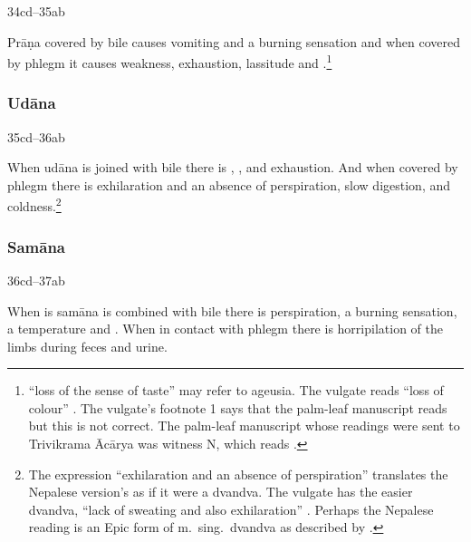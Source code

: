 \begin{translation}
\item[34cd--35ab]

Prāṇa covered by bile causes vomiting and a burning sensation and when
covered by phlegm it causes weakness, exhaustion, lassitude and
.\footnote{ “loss of
    the sense of taste” may refer to ageusia.  The vulgate reads
     “loss of colour” \citep[263]{vulgate}.  The vulgate's
    footnote 1 says that the palm-leaf manuscript reads  
    but this is not correct.  The palm-leaf manuscript whose readings were
    sent to Trivikrama Ācārya was witness N, which reads .}


\subsubsection{Udāna}

\item[35cd--36ab]

	When udāna is joined with bile there is ,
,  and exhaustion. And
when covered by phlegm there is exhilaration and an absence of
perspiration, slow digestion, and coldness.\footnote{The expression
    “exhilaration and an absence of perspiration” translates the Nepalese
    version's  as if it were a dvandva.  The vulgate
    has the easier dvandva,  “lack of sweating and also
    exhilaration” .  Perhaps the Nepalese reading is an
    Epic form of m.\ sing.\ dvandva as described by \citet[361--362,
    n.\,3]{ober-2003}.}

    
\subsubsection{Samāna}
    
\item[36cd--37ab]

	When is samāna is combined with bile there is perspiration, a burning sensation,
	a temperature and . When in contact with phlegm 
    there is horripilation of the limbs during feces and urine.



\end{translation}
